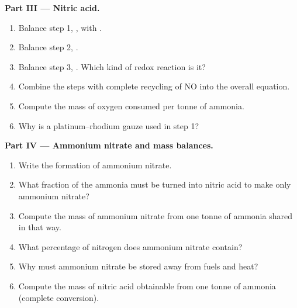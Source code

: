 \begin{problem}
\medskip
\noindent\textbf{Part III --- Nitric acid.}
\begin{enumerate}[resume]
  \item Balance step 1, , with . %
  \item Balance step 2, . %
  \item Balance step 3, . Which kind of redox %
        reaction is it?
  \item Combine the steps with complete recycling of NO into the overall
        equation.
  \item Compute the mass of oxygen consumed per tonne of ammonia.
  \item Why is a platinum--rhodium gauze used in step 1?
\end{enumerate}

\medskip
\noindent\textbf{Part IV --- Ammonium nitrate and mass balances.}
\begin{enumerate}[resume]
  \item Write the formation of ammonium nitrate.
  \item What fraction of the ammonia must be turned into nitric acid to
        make only ammonium nitrate?
  \item Compute the mass of ammonium nitrate from one tonne of ammonia
        shared in that way.
  \item What percentage of nitrogen does ammonium nitrate contain?
  \item Why must ammonium nitrate be stored away from fuels and heat?
  \item Compute the mass of nitric acid obtainable from one tonne of
        ammonia (complete conversion).
\end{enumerate}
\end{problem}
